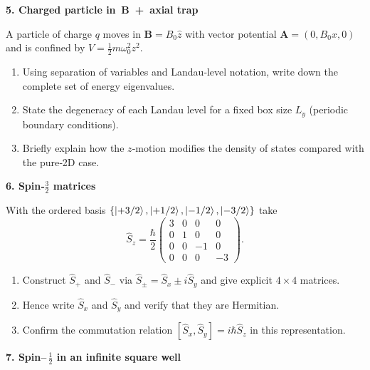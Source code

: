 \documentclass[12pt]{article}
\newcommand{\qs}{\bigskip\bigskip}
\newcommand{\vv}{\medskip}
\begin{document}
\newpage
{\large\bfseries 5.\; Charged particle in $\,\mathbf B\!$ + axial trap}\qs

A particle of charge $q$ moves in $\mathbf B=B_0\hat z$ with vector
potential $\mathbf A=(0,B_0x,0)$ and is confined by
$V=\frac12m\omega_0^{2}z^{2}$.

\begin{enumerate}[label=\textbf{\alph*)}, leftmargin=1.2cm]
  \item  Using separation of variables and Landau‑level notation,
         write down the complete set of energy eigenvalues.\vv
  \item  State the degeneracy of each Landau level for a fixed box size
         $L_y$ (periodic boundary conditions).\vv
  \item  Briefly explain how the $z$‑motion modifies the density of
         states compared with the pure‑2D case.
\end{enumerate}






\newpage
{\large\bfseries 6.\; Spin‑$\tfrac32$ matrices}\qs

With the ordered basis
$\{\ket{+3/2},\ket{+1/2},\ket{-1/2},\ket{-3/2}\}$ take
\[
  \hat S_z = \frac{\hbar}{2}
    \begin{pmatrix} 3&0&0&0\\ 0&1&0&0\\ 0&0&-1&0\\ 0&0&0&-3 \end{pmatrix}.
\]

\begin{enumerate}[label=\textbf{\alph*)}, leftmargin=1.2cm]
  \item  Construct $\hat S_+$ and $\hat S_-$ via
        $\hat S_\pm=\hat S_x\pm i\hat S_y$ and give
        explicit $4\times4$ matrices.\vv
  \item  Hence write $\hat S_x$ and $\hat S_y$ and verify that they are
        Hermitian.\vv
  \item  Confirm the commutation relation
        $[\hat S_x,\hat S_y]=i\hbar\hat S_z$ in this representation.
\end{enumerate}






\newpage
{\large\bfseries 7.\; Spin–\,$\tfrac12$ in an infinite square well}\qs
\end{document}
